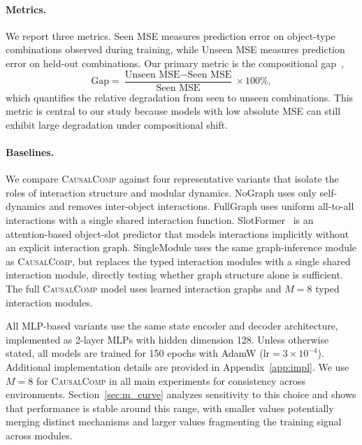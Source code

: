 \documentclass{article}
\newcommand{\ours}{\textsc{CausalComp}}
\begin{document}
\paragraph{Metrics.}
We report three metrics. Seen MSE measures prediction error on object-type combinations observed during training, while Unseen MSE measures prediction error on held-out combinations. Our primary metric is the compositional gap~\citep{keysers2020measuring},
\[
    \text{Gap} = \frac{\text{Unseen MSE} - \text{Seen MSE}}{\text{Seen MSE}} \times 100\%,
\]
which quantifies the relative degradation from seen to unseen combinations. This metric is central to our study because models with low absolute MSE can still exhibit large degradation under compositional shift.

\paragraph{Baselines.}
We compare \ours{} against four representative variants that isolate the roles of interaction structure and modular dynamics. NoGraph uses only self-dynamics and removes inter-object interactions. FullGraph uses uniform all-to-all interactions with a single shared interaction function. SlotFormer~\citep{wu2023slotformer} is an attention-based object-slot predictor that models interactions implicitly without an explicit interaction graph. SingleModule uses the same graph-inference module as \ours{}, but replaces the typed interaction modules with a single shared interaction module, directly testing whether graph structure alone is sufficient. The full \ours{} model uses learned interaction graphs and $M{=}8$ typed interaction modules.

All MLP-based variants use the same state encoder and decoder architecture, implemented as 2-layer MLPs with hidden dimension 128. Unless otherwise stated, all models are trained for 150 epochs with AdamW ($\text{lr}{=}3{\times}10^{-4}$). Additional implementation details are provided in Appendix~\ref{app:impl}.
We use $M{=}8$ for \ours{} in all main experiments for consistency across environments. Section~\ref{sec:m_curve} analyzes sensitivity to this choice and shows that performance is stable around this range, with smaller values potentially merging distinct mechanisms and larger values fragmenting the training signal across modules.
\end{document}
